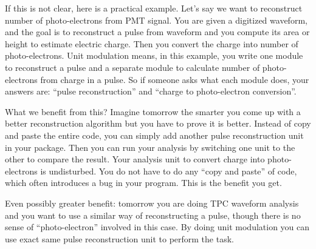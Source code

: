 If this is not clear, here is a practical example. 
Let's say we want to reconstruct number of photo-electrons from PMT signal.
You are given a digitized waveform, and the goal is to reconstruct a pulse from waveform and you compute its area or height to estimate electric charge. Then you convert the charge into number of photo-electrons.
Unit modulation means, in this example, you write one module to reconstruct a pulse and a separate module to calculate number of photo-electrons from charge in a pulse.
So if someone asks what each module does, your answers are: ``pulse reconstruction'' and ``charge to photo-electron conversion''.

What we benefit from this? Imagine tomorrow the smarter you come up with a better reconstruction algorithm but you have to prove it is better. Instead of copy and paste the entire code, you can simply add another pulse reconstruction unit in your package. Then you can run your analysis by switching one unit to the other to compare the result. Your analysis unit to convert charge into photo-electrons is undisturbed. You do not have to do any ``copy and paste'' of code, which often introduces a bug in your program. This is the benefit you get.

Even possibly greater benefit: tomorrow you are doing TPC waveform analysis and you want to use a similar way of reconstructing a pulse, though there is no sense of ``photo-electron'' involved in this case. By doing unit modulation you can use exact same pulse reconstruction unit to perform the task.















